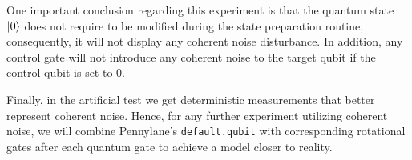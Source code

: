One important conclusion regarding this experiment is that the
quantum state \(\ket{0}\) does not require to be modified during
the state preparation routine, consequently, it will not display
any coherent noise disturbance. In addition, any control gate will
not introduce any coherent noise to the target qubit if the control
qubit is set to 0. \

Finally, in the artificial test we get deterministic measurements that
better represent coherent noise. Hence, for any further experiment
utilizing coherent noise, we will combine Pennylane's
\colorbox{inline_gray}{\lstinline|default.qubit|} with corresponding
rotational gates after each quantum gate to achieve a model closer
to reality. \








